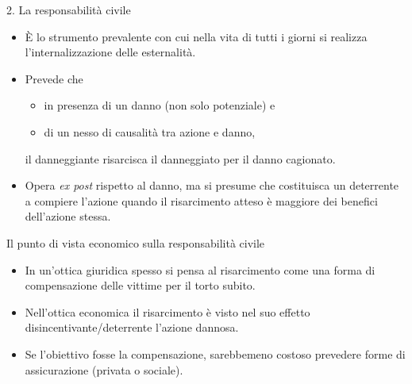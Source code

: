 \documentclass[aspectratio=64,11pt]{beamer}
\begin{document}
\begin{frame}{2. La responsabilità civile}
\begin{itemize}
\item È lo strumento prevalente con cui nella vita di tutti i giorni si realizza
l'internalizzazione delle esternalità.
\item Prevede che
\begin{itemize}
\item in presenza di un danno (non solo potenziale) e
\item di un nesso di causalità tra azione e danno,
\end{itemize}
il danneggiante risarcisca il danneggiato per il danno cagionato.
\item Opera \emph{ex post} rispetto al danno, ma si presume che costituisca un
deterrente a compiere l'azione quando il risarcimento atteso è maggiore dei
benefici dell'azione stessa.
\end{itemize}

\begin{block}{Il punto di vista economico sulla responsabilità civile}
\fontsize{10}{11}\selectfont
\begin{itemize}
\item In un'ottica giuridica spesso si pensa al risarcimento come una forma di
\alert{compensazione delle vittime} per il torto subito.
\item Nell'ottica economica il risarcimento è visto nel suo effetto
disincentivante/deterrente l'azione dannosa.
\item Se l'obiettivo fosse la compensazione, sarebbemeno costoso prevedere forme
di assicurazione (privata o sociale).
\end{itemize}
\end{block}
\end{frame}
\end{document}
